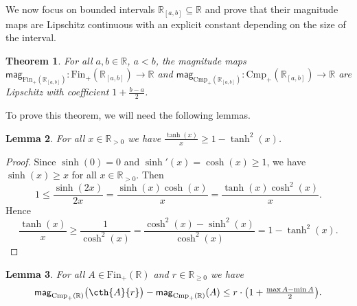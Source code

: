 \documentclass[11pt]{article}
\theoremstyle{plain}
\newtheorem{theorem}{Theorem}[section]
\newtheorem{lemma}[theorem]{Lemma}
\theoremstyle{definition}
\newcommand{\RR}{\mathbb{R}}
\newcommand{\intcc}[3][\RR]{{#1}_{[#2, #3]}}
\newcommand{\mg}[1][]{\mathsf{mag}_{#1}}
\newcommand{\fsub}{\mathrm{Fin}}
\newcommand{\ifsub}{\fsub_{+}}
\newcommand{\csub}{\mathrm{Cmp}}
\newcommand{\icsub}{\csub_{+}}
\begin{document}
We now focus on bounded intervals $\intcc{a}{b} \subseteq \RR$ and prove that their magnitude maps are Lipschitz continuous with an explicit constant depending on the size of the interval.

\begin{theorem}\label{theorem:lipschitz-continuity-of-magnitude-on-intervals}
For all $a, b \in \RR$, $a < b$, the magnitude maps $\mg[\ifsub(\intcc{a}{b})]\colon \ifsub(\intcc{a}{b}) \to \RR$ and $\mg[\icsub(\intcc{a}{b})]\colon \icsub(\intcc{a}{b}) \to \RR$ are Lipschitz with coefficient $1 + \tfrac{b - a}{2}$.
\end{theorem}

To prove this theorem, we will need the following lemmas.

\begin{lemma}\label{lemma:tanh-inequality}
For all $x \in \RR_{> 0}$ we have $\frac{\tanh(x)}{x} \geq 1 - \tanh^2(x)$.
\end{lemma}

\begin{proof}
Since $\sinh(0) = 0$ and $\sinh'(x) = \cosh(x) \geq 1$, we have $\sinh(x) \geq x$ for all $x \in \RR_{> 0}$. Then
\[1 \leq \frac{\sinh(2x)}{2x} = \frac{\sinh(x) \cosh(x)}{x} = \frac{\tanh(x) \cosh^2(x)}{x}.\]
Hence
\[\frac{\tanh(x)}{x} \geq \frac{1}{\cosh^2(x)} = \frac{\cosh^2(x) - \sinh^2(x)}{\cosh^2(x)} = 1 - \tanh^2(x).\]
\end{proof}

\begin{lemma}\label{lemma:growth-of-magnitude-of-thickening}
For all $A \in \ifsub(\RR)$ and $r \in \RR_{\geq 0}$ we have
\[\mg[\icsub(\RR)]\big(\cth{A}{r}\big) - \mg[\icsub(\RR)](A) \leq r \cdot \big(1 + \tfrac{\max{A} - \min{A}}{2}\big).\]
\end{lemma}
\end{document}
